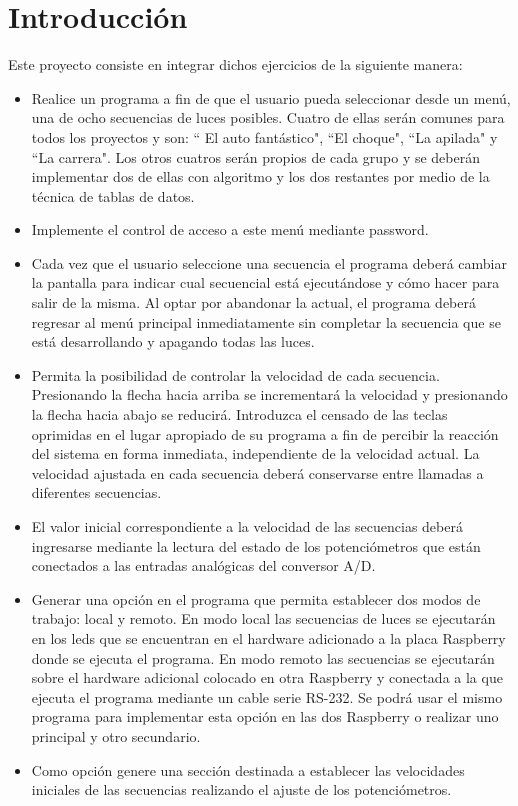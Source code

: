 \documentclass[11pt, a4paper]{article}
\begin{document}
\section{Introducción}

Este proyecto consiste en integrar dichos ejercicios de la siguiente manera:
\begin{itemize}
	\item Realice un programa a fin de que el usuario pueda seleccionar desde un menú, una de ocho secuencias de luces posibles. Cuatro de ellas serán comunes para todos los proyectos y son: `` El auto fantástico", ``El choque", ``La apilada" y ``La carrera". Los otros cuatros serán propios de cada grupo y se deberán implementar dos de ellas con algoritmo y los dos restantes por medio de la técnica de tablas de datos.
  \item Implemente el control de acceso a este menú mediante password.
  \item Cada vez que el usuario seleccione una secuencia el programa deberá cambiar la pantalla para indicar cual secuencial está ejecutándose y cómo hacer para salir de la misma. Al optar por abandonar la actual, el programa deberá regresar al menú principal inmediatamente sin completar la secuencia que se está desarrollando y apagando todas las luces.
  \item Permita la posibilidad de controlar la velocidad de cada secuencia. Presionando la flecha hacia arriba se incrementará la velocidad y presionando la flecha hacia abajo se reducirá. Introduzca el censado de las teclas oprimidas en el lugar apropiado de su programa a fin de percibir la reacción del sistema en forma inmediata, independiente de la velocidad actual. La velocidad ajustada en cada secuencia deberá conservarse entre llamadas a diferentes secuencias.
  \item El valor inicial correspondiente a la velocidad de las secuencias deberá ingresarse mediante la lectura del estado de los potenciómetros que están conectados a las entradas analógicas del conversor A/D.
  
  \item Generar una opción en el programa que permita establecer dos modos de trabajo: local y remoto. En modo local las secuencias de luces se ejecutarán en los leds que se encuentran en el hardware adicionado a la placa Raspberry donde se ejecuta el programa. En modo remoto las secuencias se ejecutarán sobre el hardware adicional colocado en otra Raspberry y conectada a la que ejecuta el programa mediante un cable serie RS-232. Se podrá usar el mismo programa para implementar esta opción en las dos Raspberry o realizar uno principal y otro secundario.
  \item Como opción genere una sección destinada a establecer las velocidades iniciales de las secuencias realizando el ajuste de los potenciómetros.
\end{itemize}
\end{document}
